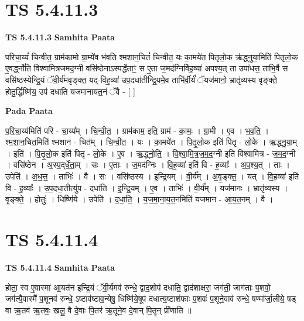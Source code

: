\documentclass[17pt]{extarticle}
\begin{document}
\section*{ TS 5.4.11.3 }

\textbf{TS 5.4.11.3 } \newline
\textbf{Samhita Paata} \newline

परिचा॒य्यं॑ चिन्वीत॒ ग्राम॑कामो ग्रा॒म्ये॑व भ॑वति श्मशान॒चितं॑ चिन्वीत॒ यः का॒मये॑त पितृलो॒क ऋ॑द्ध्नुया॒मिति॑ पितृलो॒क ए॒वर्द्ध्नो॑ति विश्वामित्रजमद॒ग्नी वसि॑ष्ठेनाऽस्पर्द्धेताꣳ॒॒ स ए॒ता ज॒मद॑ग्निर्विह॒व्या॑ अपश्य॒त् ता उपा॑धत्त॒ ताभि॒र्वै स वसि॑ष्ठस्येन्द्रि॒यं ॅवी॒र्य॑मवृङ्क्त॒ यद्-वि॑ह॒व्या॑ उप॒दधा॑तीन्द्रि॒यमे॒व ताभि॑र्वी॒र्यं॑ ॅयज॑मानो॒ भ्रातृ॑व्यस्य वृङ्क्ते॒ होतु॒र्द्धिष्णि॑य॒ उप॑ दधाति यजमानायत॒नं ॅवै - [  ] \newline

\textbf{Pada Paata} \newline

प॒रि॒चा॒य्य॑मिति॑ परि - चा॒य्य᳚म् । चि॒न्वी॒त॒ । ग्राम॑काम॒ इति॒ ग्राम॑ - का॒मः॒ । ग्रा॒मी । ए॒व । भ॒व॒ति॒ । श्म॒शा॒न॒चित॒मिति॑ श्मशान - चित᳚म् । चि॒न्वी॒त॒ । यः । का॒मये॑त । पि॒तृ॒लो॒क इति॑ पितृ - लो॒के । ऋ॒द्ध्नु॒या॒म् । इति॑ । पि॒तृ॒लो॒क इति॑ पितृ - लो॒के । ए॒व । ऋ॒द्ध्नो॒ति॒ । वि॒श्वा॒मि॒त्र॒ज॒म॒द॒ग्नी इति॑ विश्वामित्र - ज॒म॒द॒ग्नी । वसि॑ष्ठेन । अ॒स्प॒द्‌र्धे॒ता॒म् । सः । ए॒ताः । ज॒मद॑ग्निः । वि॒ह॒व्या॑ इति॑ वि - ह॒व्याः᳚ । अ॒प॒श्य॒त् । ताः । उपेति॑ । अ॒ध॒त्त॒ । ताभिः॑ । वै । सः । वसि॑ष्ठस्य । इ॒न्द्रि॒यम् । वी॒र्य᳚म् । अ॒वृ॒ङ्क्त॒ । यत् । वि॒ह॒व्या॑ इति॑ वि - ह॒व्याः᳚ । उ॒प॒दधा॒तीत्यु॑प - दधा॑ति । इ॒न्द्रि॒यम् । ए॒व । ताभिः॑ । वी॒र्य᳚म् । यज॑मानः । भ्रातृ॑व्यस्य । वृ॒ङ्क्ते॒ । होतुः॑ । धिष्णि॑ये । उपेति॑ । द॒धा॒ति॒ । य॒ज॒मा॒ना॒य॒त॒नमिति॑ यजमान - आ॒य॒त॒नम् । वै ।  \newline




\section*{ TS 5.4.11.4 }

\textbf{TS 5.4.11.4 } \newline
\textbf{Samhita Paata} \newline

होता॒ स्व ए॒वास्मा॑ आ॒यत॑न इन्द्रि॒यं ॅवी॒र्य॑मव॑ रुन्धे॒ द्वाद॒शोप॑ दधाति॒ द्वाद॑शाक्षरा॒ जग॑ती॒ जाग॑ताः प॒शवो॒ जग॑त्यै॒वास्मै॑ प॒शूनव॑ रुन्धे॒ ऽष्टाव॑ष्टाव॒न्येषु॒ धिष्णि॑ये॒षूप॑ दधात्य॒ष्टाश॑फाः प॒शवः॑ प॒शूने॒वाव॑ रुन्धे॒ षण्मा᳚र्जा॒लीये॒ षड् वा ऋ॒तव॑ ऋ॒तवः॒ खलु॒ वै दे॒वाः पि॒तर॑ ऋ॒तूने॒व दे॒वान् पि॒तॄन् प्री॑णाति ॥ \newline
\end{document}
